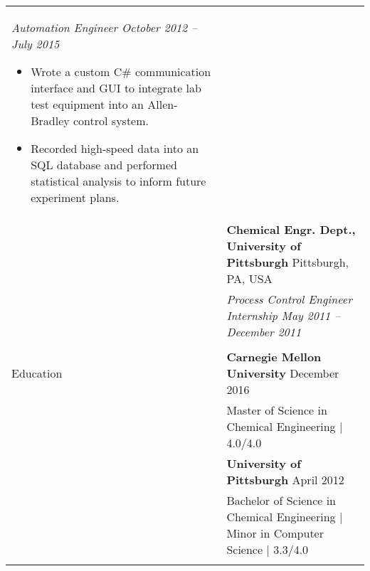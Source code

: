 \documentclass[11pt]{article}
\begin{document}
\begin{tabular}[t]{@{}p{1.05in} @{}p{6.00in}}
    \textit{Automation Engineer \hfill October 2012 -- July 2015}
        \begin{itemize}[noitemsep,topsep=0pt]
                \item Wrote a custom C\# communication interface and GUI to integrate lab test equipment into an Allen-Bradley control system.%
                \item Recorded high-speed data into an SQL database and performed statistical analysis to inform future experiment plans.%
        \end{itemize}
\\
&
\textbf{Chemical Engr. Dept., University of Pittsburgh}  \hfill Pittsburgh, PA, USA\vspace{0.015in} \\ &
 
    \textit{Process Control Engineer Internship \hfill May 2011 -- December 2011}
\\
\\


{Education}
&
\textbf{Carnegie Mellon University} \hfill December 2016 \vspace{0.015in} \\ &
Master of Science in Chemical Engineering | 4.0/4.0 \vspace{0.015in}
\vspace{0.5\baselineskip}
\\
&
\textbf{University of Pittsburgh} \hfill April 2012 \vspace{0.015in} \\ &
Bachelor of Science in Chemical Engineering | Minor in Computer Science | 3.3/4.0 \vspace{0.015in}
\vspace{0.5\baselineskip}
\\
\\

\end{tabular}
\end{document}
